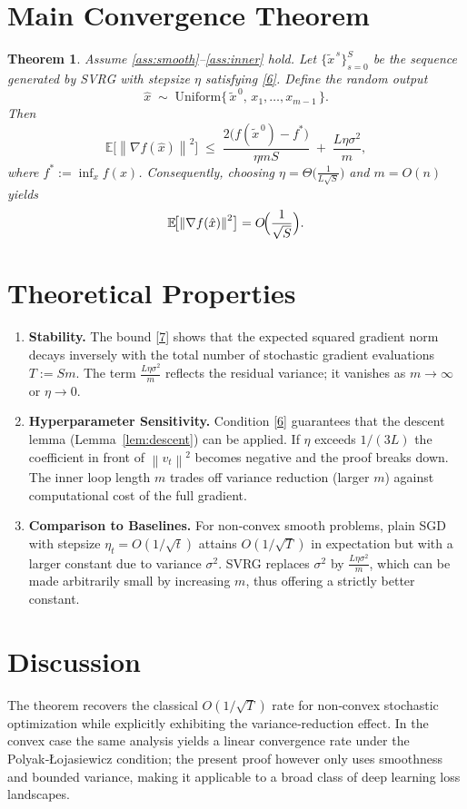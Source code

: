 \documentclass{article}
\newtheorem{theorem}{Theorem}
\newcommand{\EE}{\mathbb{E}}
\newcommand{\norm}[1]{\left\|#1\right\|}
\newcommand{\grad}{\nabla}
\begin{document}
\section*{Main Convergence Theorem}
\begin{theorem}\label{thm:nonconvex}
Assume \ref{ass:smooth}–\ref{ass:inner} hold. Let $\{\tilde{x}^{\,s}\}_{s=0}^{S}$ be the sequence generated by SVRG with stepsize $\eta$ satisfying \eqref{6}. Define the random output
\[
\hat{x}\;\sim\;\text{Uniform}\bigl\{\,\tilde{x}^{\,0},\,x_{1},\dots,x_{m-1}\,\bigr\}.
\]
Then
\[
\EE\!\bigl[\norm{\grad f(\hat{x})}^{2}\bigr]
\;\le\;
\frac{2\bigl(f(\tilde{x}^{\,0})-f^{*}\bigr)}{\eta m S}
\;+\;
\frac{L\eta\sigma^{2}}{m}, 
\tag{7}
\]
where $f^{*}:=\inf_{x}f(x)$. Consequently, choosing $\eta = \Theta\!\bigl(\frac{1}{L\sqrt{S}}\bigr)$ and $m=O(n)$ yields
\[
\EE\!\bigl[\norm{\grad f(\hat{x})}^{2}\bigr]=O\!\Bigl(\frac{1}{\sqrt{S}}\Bigr).
\]
\end{theorem}

\section*{Theoretical Properties}
\begin{enumerate}[label=\arabic*.]
\item \textbf{Stability.} The bound \eqref{7} shows that the expected squared gradient norm decays inversely with the total number of stochastic gradient evaluations $T:=Sm$. The term $\frac{L\eta\sigma^{2}}{m}$ reflects the residual variance; it vanishes as $m\to\infty$ or $\eta\to0$.
\item \textbf{Hyperparameter Sensitivity.} Condition \eqref{6} guarantees that the descent lemma (Lemma~\ref{lem:descent}) can be applied. If $\eta$ exceeds $1/(3L)$ the coefficient in front of $\norm{v_t}^{2}$ becomes negative and the proof breaks down. The inner loop length $m$ trades off variance reduction (larger $m$) against computational cost of the full gradient.
\item \textbf{Comparison to Baselines.} For non‑convex smooth problems, plain SGD with stepsize $\eta_t=O(1/\sqrt{t})$ attains $O(1/\sqrt{T})$ in expectation but with a larger constant due to variance $\sigma^{2}$. SVRG replaces $\sigma^{2}$ by $\frac{L\eta\sigma^{2}}{m}$, which can be made arbitrarily small by increasing $m$, thus offering a strictly better constant.
\end{enumerate}

\section*{Discussion}
The theorem recovers the classical $O(1/\sqrt{T})$ rate for non‑convex stochastic optimization while explicitly exhibiting the variance‑reduction effect. In the convex case the same analysis yields a linear convergence rate under the Polyak‑Łojasiewicz condition; the present proof however only uses smoothness and bounded variance, making it applicable to a broad class of deep learning loss landscapes.
\end{document}
